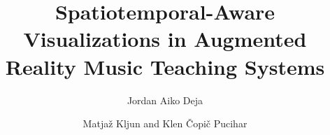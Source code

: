 \documentclass[manuscript,screen]{acmart}
\begin{document}
\title{Spatiotemporal-Aware Visualizations in Augmented Reality Music Teaching Systems}

\author{Jordan Aiko Deja}

\author{Matjaž Kljun and Klen Čopič Pucihar}

\end{document}
